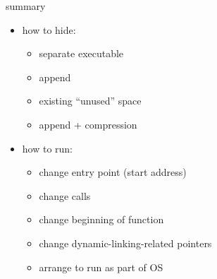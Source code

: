 
\begin{frame}{summary}
    \begin{itemize}
    \item how to hide:
        \begin{itemize}
        \item separate executable
        \item append
        \item existing ``unused'' space
        \item append + compression
        \end{itemize}
    \item how to run:
        \begin{itemize}
        \item change entry point (start address)
        \item change calls
        \item change beginning of function
        \item change dynamic-linking-related pointers
        \item arrange to run as part of OS
        \end{itemize}
    \end{itemize}
\end{frame}
